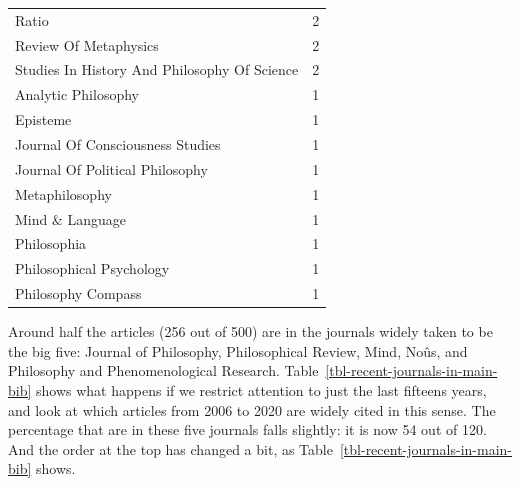 \documentclass[
  10pt,
  letterpaper,
  DIV=11,
  numbers=noendperiod,
  twoside]{scrartcl}
\begin{document}
\begin{longtable}[]{@{}lr@{}}
Ratio & 2 \\
Review Of Metaphysics & 2 \\
Studies In History And Philosophy Of Science & 2 \\
Analytic Philosophy & 1 \\
Episteme & 1 \\
Journal Of Consciousness Studies & 1 \\
Journal Of Political Philosophy & 1 \\
Metaphilosophy & 1 \\
Mind \& Language & 1 \\
Philosophia & 1 \\
Philosophical Psychology & 1 \\
Philosophy Compass & 1 \\

\end{longtable}

Around half the articles (256 out of 500) are in the journals widely
taken to be the big five: Journal of Philosophy, Philosophical Review,
Mind, Noûs, and Philosophy and Phenomenological Research.
Table~\ref{tbl-recent-journals-in-main-bib} shows what happens if we
restrict attention to just the last fifteens years, and look at which
articles from 2006 to 2020 are widely cited in this sense. The
percentage that are in these five journals falls slightly: it is now 54
out of 120. And the order at the top has changed a bit, as
Table~\ref{tbl-recent-journals-in-main-bib} shows.
\end{document}
